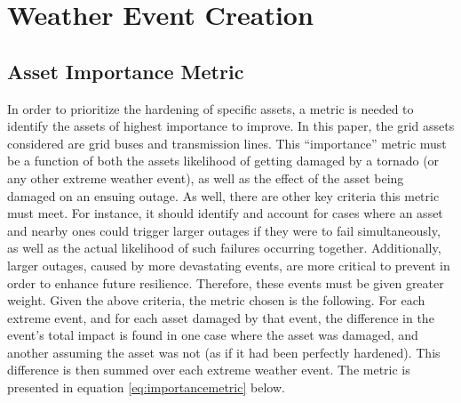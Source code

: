 \documentclass[12pt]{article}
\begin{document}
\section{Weather Event Creation}
\subsection{Asset Importance Metric}
In order to prioritize the hardening of specific assets, a metric is needed to identify the assets of highest importance to improve. In this paper, the grid assets considered are grid buses and transmission lines. This “importance” metric must be a function of both the assets likelihood of getting damaged by a tornado (or any other extreme weather event), as well as the effect of the asset being damaged on an ensuing outage. As well, there are other key criteria this metric must meet. For instance, it should identify and account for cases where an asset and nearby ones could trigger larger outages if they were to fail simultaneously, as well as the actual likelihood of such failures occurring together. Additionally, larger outages, caused by more devastating events, are more critical to prevent in order to enhance future resilience. Therefore, these events must be given greater weight.
Given the above criteria, the metric chosen is the following. For each extreme event, and for each asset damaged by that event, the difference in the event’s total impact is found in one case where the asset was damaged, and another assuming the asset was not (as if it had been perfectly hardened). This difference is then summed over each extreme weather event. The metric is presented in equation \eqref{eq:importancemetric} below. 
\end{document}
